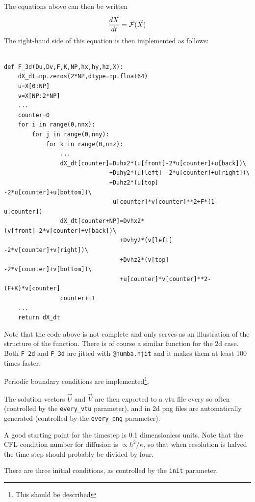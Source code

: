The equations above can then be written 
\[
\frac{d\vec{X}}{dt} 
= \vec{\cal F} (\vec{X})
\]
The right-hand side of this equation is then implemented as follows:
\begin{lstlisting}

def F_3d(Du,Dv,F,K,NP,hx,hy,hz,X):
    dX_dt=np.zeros(2*NP,dtype=np.float64)
    u=X[0:NP]
    v=X[NP:2*NP]
    ...
    counter=0
    for i in range(0,nnx):
        for j in range(0,nny):
            for k in range(0,nnz):
                ... 
                dX_dt[counter]=Duhx2*(u[front]-2*u[counter]+u[back])\
                              +Duhy2*(u[left] -2*u[counter]+u[right])\
                              +Duhz2*(u[top]  -2*u[counter]+u[bottom])\
                              -u[counter]*v[counter]**2+F*(1-u[counter])
                dX_dt[counter+NP]=Dvhx2*(v[front]-2*v[counter]+v[back])\
                                 +Dvhy2*(v[left] -2*v[counter]+v[right])\
                                 +Dvhz2*(v[top]  -2*v[counter]+v[bottom])\
                                 +u[counter]*v[counter]**2-(F+K)*v[counter]
                counter+=1
    ...
    return dX_dt
\end{lstlisting}
Note that the code above is not complete and only serves as an 
illustration of the structure of the function.
There is of course a similar function for the 2d case.
Both \lstinline{F_2d} and \lstinline{F_3d} are jitted with
\lstinline{@numba.njit} and it makes them at least 100 times faster.

Periodic boundary conditions are implemented\footnote{This should be described}.

The solution vectors $\vec{U}$ and $\vec{V}$ are then exported to 
a vtu file every so often (controlled by the \lstinline{every_vtu} parameter),
and in 2d png files are automatically generated (controlled by 
the \lstinline{every_png} parameter).

A good starting point for the timestep is 0.1 dimensionless units.
Note that the CFL condition number for diffusion is $\propto h^2/\kappa$, 
so that when resolution is halved the time step should probably be divided by four. 

There are three initial conditions, as controlled by the \lstinline{init} parameter.

